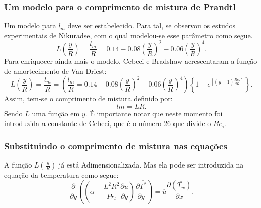 \documentclass[xcolor=dvipsnames,10pt,aspectratio=169]{beamer}
\begin{document}
	
	
	
		\begin{frame}
			\frametitle{Um modelo para o comprimento de mistura de Prandtl}
			Um modelo para $l_m$ deve ser estabelecido. Para tal, se observou os estudos experimentais de Nikuradse, com o qual modelou-se esse parâmetro como segue.
			\begin{equation}
			L\left(\frac{y}{R}\right) = \frac{l_m}{R} = 0.14 - 0.08 \left(\frac{y}{R}\right)^2 - 0.06\left(\frac{y}{R}\right)^4.
			\end{equation}
			Para enriquecer ainda mais o modelo, Cebeci e Bradshaw acrescentaram a função de amortecimento de Van Driest:
			\begin{equation}
			L\left(\frac{y}{R}\right)  = \frac{l_m}{R} = \left(\frac{l_m}{R} = 0.14 - 0.08 \left(\frac{y}{R}\right)^2 - 0.06\left(\frac{y}{R}\right)^4\right)\left\{  1 - e^{[(\tilde{y} - 1) \frac{Re_\tau}{26}]}\right\}.
			\end{equation}
			Assim, tem-se o comprimento de mistura definido por:
			\begin{equation}
			lm = L R.
			\end{equation}
			Sendo $ L $ uma função em $ y $. É importante notar que neste momento foi introduzida a constante de Cebeci, que é o número $ 26 $ que divide o $ Re_\tau $.
		\end{frame}
		
		
		
		
		
		\begin{frame}
			\frametitle{Substituindo o comprimento de mistura nas equações}
			A função $ L(\frac{y}{R}) $ já está Adimensionalizada. Mas ela pode ser introduzida na equação da temperatura como segue:
				\begin{equation}
				{\frac{\partial{}}{\partial{y}}} \left( \left( \alpha   
				- \frac{{L}^2 R ^2}{Pr_t}\frac{\partial \overline{u}}{\partial y} \right) \frac{\partial \overline{T^\ast}}{\partial y} \right)
				= 
				\overline{u}\frac{\partial{}\left(\overline{T_w}\right)  }{\partial{x}}.
				\end{equation}
		\end{frame}
		
		
		
		
		
\end{document}
